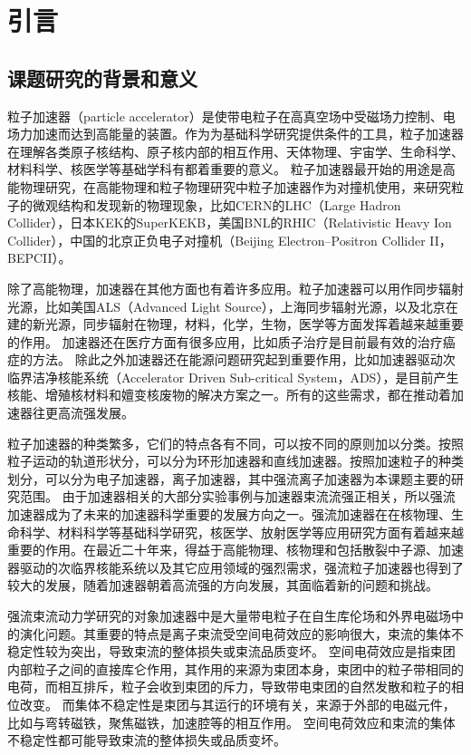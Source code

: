 
\chapter{引言}
\label{chap:introduction}

\section{课题研究的背景和意义}
粒子加速器（particle accelerator）是使带电粒子在高真空场中受磁场力控制、电场力加速而达到高能量的装置。作为为基础科学研究提供条件的工具，粒子加速器在理解各类原子核结构、原子核内部的相互作用、天体物理、宇宙学、生命科学、材料科学、核医学等基础学科有都着重要的意义。
粒子加速器最开始的用途是高能物理研究，在高能物理和粒子物理研究中粒子加速器作为对撞机使用，来研究粒子的微观结构和发现新的物理现象，比如CERN的LHC（Large Hadron Collider），日本KEK的SuperKEKB，美国BNL的RHIC（Relativistic Heavy Ion Collider），中国的北京正负电子对撞机（Beijing Electron–Positron Collider II，BEPCII）。

除了高能物理，加速器在其他方面也有着许多应用。粒子加速器可以用作同步辐射光源，比如美国ALS（Advanced Light Source），上海同步辐射光源，以及北京在建的新光源，同步辐射在物理，材料，化学，生物，医学等方面发挥着越来越重要的作用。
加速器还在医疗方面有很多应用，比如质子治疗是目前最有效的治疗癌症的方法。
除此之外加速器还在能源问题研究起到重要作用，比如加速器驱动次临界洁净核能系统（Accelerator Driven Sub-critical System，ADS），是目前产生核能、增殖核材料和嬗变核废物的解决方案之一。所有的这些需求，都在推动着加速器往更高流强发展。

粒子加速器的种类繁多，它们的特点各有不同，可以按不同的原则加以分类。按照粒子运动的轨道形状分，可以分为环形加速器和直线加速器。按照加速粒子的种类划分，可以分为电子加速器，离子加速器，其中强流离子加速器为本课题主要的研究范围。
由于加速器相关的大部分实验事例与加速器束流流强正相关，所以强流加速器成为了未来的加速器科学重要的发展方向之一。强流加速器在在核物理、生命科学、材料科学等基础科学研究，核医学、放射医学等应用研究方面有着越来越重要的作用。在最近二十年来，得益于高能物理、核物理和包括散裂中子源、加速器驱动的次临界核能系统以及其它应用领域的强烈需求，强流粒子加速器也得到了较大的发展\cite{wei2003synchrotrons,chou2002synchrotron}，随着加速器朝着高流强的方向发展，其面临着新的问题和挑战。

强流束流动力学研究的对象加速器中是大量带电粒子在自生库伦场和外界电磁场中的演化问题。其重要的特点是离子束流受空间电荷效应的影响很大，束流的集体不稳定性较为突出，导致束流的整体损失或束流品质变坏。
空间电荷效应是指束团内部粒子之间的直接库仑作用，其作用的来源为束团本身，束团中的粒子带相同的电荷，而相互排斥，粒子会收到束团的斥力，导致带电束团的自然发散和粒子的相位改变。
而集体不稳定性是束团与其运行的环境有关，来源于外部的电磁元件，比如与弯转磁铁，聚焦磁铁，加速腔等的相互作用。
空间电荷效应和束流的集体不稳定性都可能导致束流的整体损失或品质变坏。

